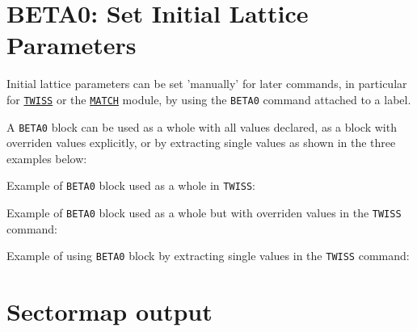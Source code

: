 \section{BETA0: Set Initial Lattice Parameters}
\label{sec:beta0}
Initial lattice parameters can be set 'manually' for later commands, in
particular for \hyperref[chap:twiss]{\texttt{TWISS}} or the 
\hyperref[chap:match]{\texttt{MATCH}} module, by
using the \texttt{BETA0} command attached to a label.  


A \texttt{BETA0} block can be used as a whole with all values declared,
as a block with overriden values explicitly, or by extracting single
values as shown in the three examples below:

Example of \texttt{BETA0} block used as a whole in \texttt{TWISS}: 

Example of \texttt{BETA0} block used as a whole but with overriden
values in the \texttt{TWISS} command:

Example of using \texttt{BETA0} block by extracting single values in the
\texttt{TWISS} command:


%
\section{Sectormap output}
\label{sec:sectormap}


